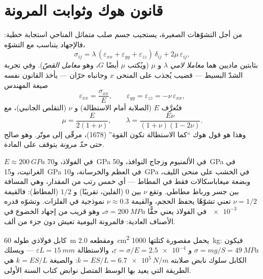 \section{قانون هوك وثوابت المرونة}

\begin{theorem}\label{thm:b3:continuum-elasticity:hooke}
من أجل التشوّهات الصغيرة، يستجيب جسم صلب متماثل المناحي استجابة
خطية: فالإجهاد يتناسب مع التشوّه،
\[
\sigma_{ij} = \lambda\,(\varepsilon_{xx} + \varepsilon_{yy} +
\varepsilon_{zz})\,\delta_{ij} + 2\mu\,\varepsilon_{ij} ,
\]
بثابتين ماديين هما \emph{معاملا لامي} $\lambda$ و
$\mu$ (ويُكتب $\mu$ أيضًا $G$، وهو \emph{معامل القصّ}). وفي
تجربة الشدّ البسيط --- قضيب يُجذب على المنحى $x$ وجانباه حرّان ---
يأخذ القانون نفسه صيغة المهندس
\[
\varepsilon_{xx} = \frac{\sigma_{xx}}{E} , \qquad
\varepsilon_{yy} = \varepsilon_{zz} = -\nu\,\varepsilon_{xx} ,
\]
فتُعرَّف \emph{} $E$ (الصلابة أمام الاستطالة) و
\emph{} $\nu$ (التقلص الجانبي)، مع
\[
\mu = \frac{E}{2(1 + \nu)} , \qquad
\lambda = \frac{E\nu}{(1 + \nu)(1 - 2\nu)} .
\]
وهذا هو قول هوك ``كما الاستطالة تكون القوة'' (1678)، مرقّى إلى
موتّر. وهو صالح حتى \emph{حدّ مرونة} يتوقف على المادة.
\end{theorem}
\admitted

\begin{remark}\label{rem:b3:continuum-elasticity:orders}
$E \approx \qty{200}{GPa}$ في الفولاذ، و\qty{70}{GPa} في الألمنيوم
وزجاج النوافذ، و\qty{50}{GPa} في الغرانيت، و\qty{15}{GPa} في العظم
والخرسانة، و\qty{10}{GPa} في الخشب على منحى الليف، وبضعة
ميغاباسكالات فقط في المطاط --- أي خمس رتب من المقدار، وهي المسافة
بين جسر ورباط مطاطي. وتقع $\nu$ بين $0$ (الفلين، تقريبًا) و $1/2$
(المطاط): فالقيمة $\nu = 1/2$ تعني تشوّهًا يحفظ الحجم، والقيمة
$\nu \approx 0.3$ نموذجية في الفلزات. وتشوّه قدره $\num{e-3}$ في
الفولاذ يعني حقًّا $\sigma = \qty{200}{MPa}$، وهو قريب من إجهاد
الخضوع في الأصناف العادية: فالمرونة اليومية تعيش دون جزء من ألف.
\end{remark}

\begin{example}\label{ex:b3:continuum-elasticity:cable}
كابل فولاذي طوله \qty{60}{m} ومقطعه \qty{2.0}{cm^2} يحمل مقصورة
كتلتها \qty{1000}{kg}: فيكون $\sigma = mg/S = \qty{49}{MPa}$ و $\varepsilon =
\sigma/E = \num{2.5e-4}$، والاستطالة $\varepsilon L = \qty{15}{mm}$ ---
ويسلك الكابل سلوك نابض صلابته $k = ES/L =
\qty{6.7e5}{N/m}$: والصيغة $k = ES/L$ هي الطريقة التي يعيد بها
الوسط المتصل نوابض كتاب السنة الأولى.
\end{example}

